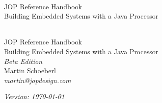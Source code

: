 \setcounter{page}{1}

\begin{flushleft}
\pagestyle{empty}
\ \\
\vspace{1cm}
{\mdseries\Large JOP Reference Handbook\\
\medskip
\large Building Embedded Systems with a Java Processor}
\cleardoublepage
\end{flushleft}


\begin{flushleft}
\pagestyle{empty}
\ \\
\vspace{1cm}
{\Huge JOP Reference Handbook\\
\mdseries
{\Large Building Embedded Systems with a Java Processor}\\
\bigskip
{\large\itshape Beta Edition}\\
\bigskip
{\huge Martin Schoeberl}
\medskip\\
{\large\itshape martin@jopdesign.com} }


\vspace{10cm} \emph{Version: \today}
\newpage
\end{flushleft}




